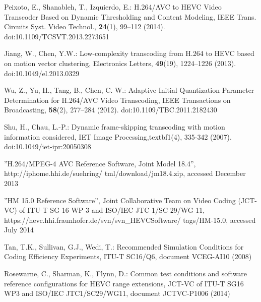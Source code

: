 \documentclass[twocolumn]{svjour3}          %
\begin{document}
\begin{thebibliography}{}
Peixoto, E., Shanableh, T., Izquierdo, E.: H.264/AVC to HEVC Video Transcoder Based on Dynamic Thresholding and Content Modeling, IEEE Trans. Circuits Syst. Video Technol., \textbf{24}(1), 99–112 (2014). doi:10.1109/TCSVT.2013.2273651

Jiang, W., Chen, Y.W.: Low-complexity transcoding from H.264 to HEVC based on motion vector clustering, Electronics Letters, \textbf{49}(19), 1224–1226 (2013). doi:10.1049/el.2013.0329

Wu, Z., Yu, H., Tang, B., Chen, C. W.: Adaptive Initial Quantization Parameter Determination for H.264/AVC Video Transcoding, IEEE Transactions on Broadcasting, \textbf{58}(2), 277–284 (2012). doi:10.1109/TBC.2011.2182430

Shu, H., Chau, L.-P.: Dynamic frame-skipping transcoding with motion information considered, IET Image Processing,textbf{1}(4), 335-342 (2007). doi:10.1049/iet-ipr:20050308

''H.264/MPEG-4 AVC Reference Software, Joint Model 18.4'', http://iphome.hhi.de/suehring/
tml/download/jm18.4.zip, accessed December 2013

''HM 15.0 Reference Software'', Joint Collaborative Team on Video Coding (JCT-VC) of ITU-T SG 16 WP 3 and ISO/IEC JTC 1/SC 29/WG 11, https://hevc.hhi.fraunhofer.de/svn/svn\_HEVCSoftware/
tags/HM-15.0, accessed July 2014

Tan, T.K., Sullivan, G.J., Wedi, T.: Recommended Simulation Conditions for Coding Efficiency Experiments, ITU-T SC16/Q6, document VCEG-AI10 (2008)

Rosewarne, C.,  Sharman, K., Flynn, D.: Common test conditions and software reference configurations for HEVC range extensions, JCT-VC of ITU-T SG16 WP3 and ISO/IEC JTC1/SC29/WG11, document JCTVC-P1006 (2014)

\end{thebibliography}
\end{document}
